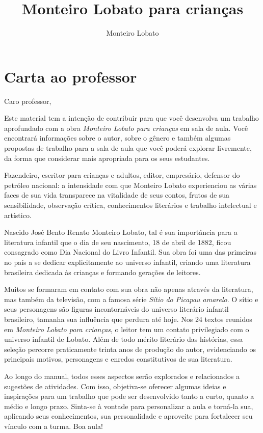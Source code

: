 \documentclass[11pt]{extarticle}
\newcommand{\AutorLivro}{Monteiro Lobato}
\newcommand{\TituloLivro}{Monteiro Lobato para crianças}
\newcommand{\colaborador}{Paulo Pompermaier}
\begin{document}
\title{\TituloLivro}
\author{\AutorLivro}
\def\authornotes{\colaborador}

\date{}
\maketitle

\tableofcontents

\section{Carta ao professor}

Caro professor,

Este material tem a intenção de contribuir para que você desenvolva um trabalho aprofundado com a obra \textit{Monteiro Lobato para crianças} em sala de aula.
Você encontrará informações sobre o autor, sobre o gênero e também 
algumas propostas de trabalho para a sala de aula que você poderá explorar livremente, 
da forma que considerar mais apropriada para os seus estudantes.

Fazendeiro, escritor para crianças e adultos, editor, empresário,
defensor do petróleo nacional: a intensidade com que Monteiro Lobato
experienciou as várias faces de sua vida transparece na vitalidade de
seus contos, frutos de sua sensibilidade, observação crítica,
conhecimentos literários e trabalho intelectual e artístico.

Nascido José Bento Renato Monteiro Lobato, tal é sua importância para a literatura infantil que o dia de seu nascimento, 18 de abril de 1882, ficou consagrado como Dia Nacional do Livro Infantil. Sua obra foi uma das primeiras no país a se dedicar explicitamente ao universo infantil, criando uma literatura brasileira dedicada às crianças e formando gerações de leitores.

Muitos se formaram em contato com sua obra não apenas através da literatura, mas também da televisão, com a famosa série \textit{Sítio do Picapau amarelo}. O sítio e seus personagens são figuras incontornáveis do universo literário infantil brasileiro, tamanha sua influência que perdura até hoje. Nos 24 textos reunidos em \textit{Monteiro Lobato para crianças}, o leitor tem um contato privilegiado com o universo infantil de Lobato.
Além de todo mérito literário das histórias, essa seleção percorre praticamente trinta anos de produção do autor, evidenciando os principais motivos, personagens e enredos constitutivos de sua literatura.

Ao longo do manual, todos esses aspectos serão explorados e relacionados a sugestões de atividades. Com isso, objetiva-se oferecer algumas ideias e inspirações para um trabalho que pode ser desenvolvido tanto a curto, quanto a médio e longo prazo. Sinta-se à vontade para personalizar a aula e torná-la sua, aplicando seus conhecimentos, sua 
personalidade e aproveite para fortalecer seu vínculo com a turma.
Boa aula!
\end{document}
